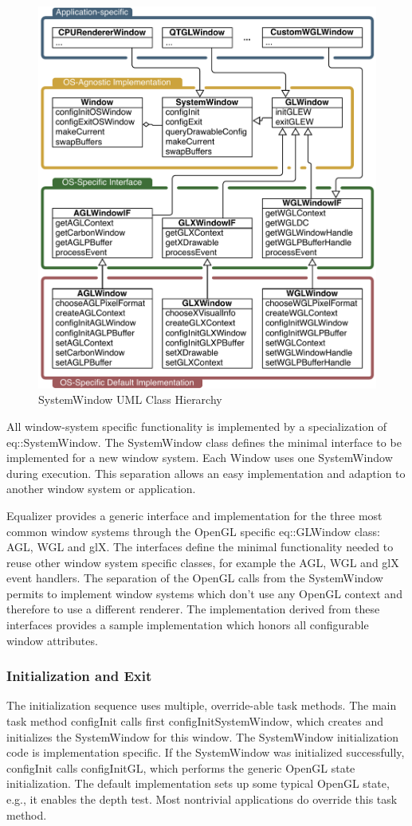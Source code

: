 \documentclass[10pt,a4]{scrartcl}
\begin{document}
\begin{figure}
  \vspace{-2ex}\includegraphics[width=.618\textwidth]{images/osWindow.pdf}
  {\caption{\label{fOSWindow}SystemWindow UML Class Hierarchy}}
\end{figure}
All window-system specific functionality is implemented by a specialization of
\textsf{eq::Sys\-tem\-Window}. The \textsf{SystemWindow} class defines the
minimal interface to be implemented for a new window system. Each
\textsf{Window} uses one \textsf{SystemWindow} during execution. This separation
allows an easy implementation and adaption to another window system or
application.

Equalizer provides a generic interface and implementation for the three
most common window systems through the OpenGL specific 
\textsf{eq::GL\-Window} class: AGL, WGL and glX. The interfaces define the
minimal functionality needed to reuse other window system specific
classes, for example the AGL, WGL and glX event handlers. The separation 
of the OpenGL calls from the \textsf{SystemWindow} permits to implement 
window systems which don't use any OpenGL context and therefore to use a 
different renderer. The implementation derived from these interfaces 
provides a sample implementation which honors all configurable window 
attributes.

\subsubsection{Initialization and Exit}

The initialization sequence uses multiple, override-able task
methods. The main task method \textsf{configInit} calls first
\textsf{configInitSystemWindow}, which creates and initializes the
\textsf{SystemWindow} for this window. The \textsf{SystemWindow} initialization
code is implementation specific. If the \textsf{SystemWindow} was
initialized successfully, \textsf{configInit} calls
\textsf{configInitGL}, which performs the generic OpenGL state
initialization. The default implementation sets up some typical OpenGL
state, e.g., it enables the depth test. Most nontrivial applications
do override this task method.
\end{document}
